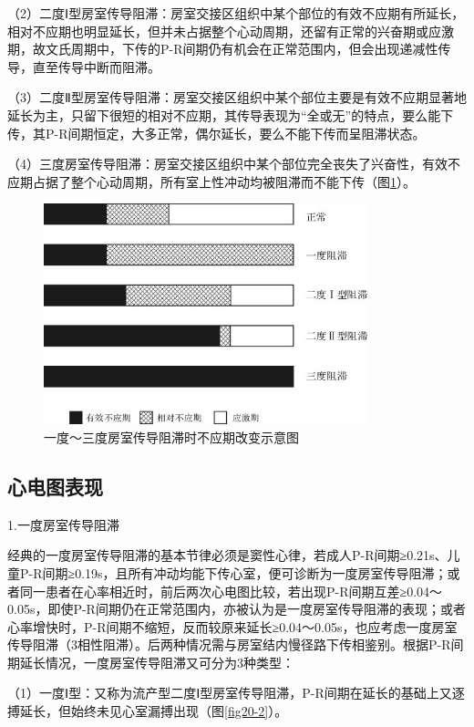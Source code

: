 （2）二度Ⅰ型房室传导阻滞：房室交接区组织中某个部位的有效不应期有所延长，相对不应期也明显延长，但并未占据整个心动周期，还留有正常的兴奋期或应激期，故文氏周期中，下传的P-R间期仍有机会在正常范围内，但会出现递减性传导，直至传导中断而阻滞。

（3）二度Ⅱ型房室传导阻滞：房室交接区组织中某个部位主要是有效不应期显著地延长为主，只留下很短的相对不应期，其传导表现为“全或无”的特点，要么能下传，其P-R间期恒定，大多正常，偶尔延长，要么不能下传而呈阻滞状态。

（4）三度房室传导阻滞：房室交接区组织中某个部位完全丧失了兴奋性，有效不应期占据了整个心动周期，所有室上性冲动均被阻滞而不能下传（图\ref{fig20-1}）。

\begin{figure}[!htbp]
 \centering
 \includegraphics[width=3.69792in,height=2.52083in]{./images/Image00330.jpg}
 \captionsetup{justification=centering}
 \caption{一度～三度房室传导阻滞时不应期改变示意图}
 \label{fig20-1}
  \end{figure} 

\protect\hypertarget{text00027.htmlux5cux23subid327}{}{}

\subsection{心电图表现}

1.一度房室传导阻滞

经典的一度房室传导阻滞的基本节律必须是窦性心律，若成人P-R间期≥0.21s、儿童P-R间期≥0.19s，且所有冲动均能下传心室，便可诊断为一度房室传导阻滞；或者同一患者在心率相近时，前后两次心电图比较，若出现P-R间期互差≥0.04～0.05s，即使P-R间期仍在正常范围内，亦被认为是一度房室传导阻滞的表现；或者心率增快时，P-R间期不缩短，反而较原来延长≥0.04～0.05s，也应考虑一度房室传导阻滞（3相性阻滞）。后两种情况需与房室结内慢径路下传相鉴别。根据P-R间期延长情况，一度房室传导阻滞又可分为3种类型：

（1）一度Ⅰ型：又称为流产型二度Ⅰ型房室传导阻滞，P-R间期在延长的基础上又逐搏延长，但始终未见心室漏搏出现（图\ref{fig20-2}）。

